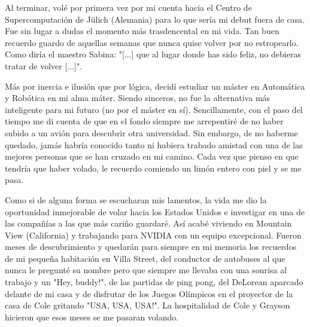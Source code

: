 Al terminar, volé por primera vez por mi cuenta hacia el Centro de Supercomputación de Jülich (Alemania) para lo que sería mi debut fuera de casa. Fue sin lugar a dudas el momento más trasdencental en mi vida. Tan buen recuerdo guardo de aquellas semanas que nunca quise volver por no estropearlo. Como diría el maestro Sabina: "[...] que al lugar donde has sido feliz, no debieras tratar de volver [...]".

Más por inercia e ilusión que por lógica, decidí estudiar un máster en Automática y Robótica en mi alma máter. Siendo sinceros, no fue la alternativa más inteligente para mi futuro (no por el máster en sí). Sencillamente, con el paso del tiempo me di cuenta de que en el fondo siempre me arrepentiré de no haber subido a un avión para descubrir otra universidad. Sin embargo, de no haberme quedado, jamás habría conocido tanto ni hubiera trabado amistad con una de las mejores personas que se han cruzado en mi camino. Cada vez que pienso en que tendría que haber volado, le recuerdo comiendo un limón entero con piel y se me pasa.

Como si de alguna forma se escucharan mis lamentos, la vida me dio la oportunidad inmejorable de volar hacia los Estados Unidos e investigar en una de las compañías a las que más cariño guardaré. Así acabé viviendo en Mountain View (California) y trabajando para NVIDIA con un equipo excepcional. Fueron meses de descubrimiento y quedarán para siempre en mi memoria los recuerdos de mi pequeña habitación en Villa Street, del conductor de autobuses al que nunca le pregunté su nombre pero que siempre me llevaba con una sonrisa al trabajo y un "Hey, buddy!", de las partidas de ping pong, del DeLorean aparcado delante de mi casa y de disfrutar de los Juegos Olímpicos en el proyector de la casa de Cole gritando "USA, USA, USA!". La hospitalidad de Cole y Grayson hicieron que esos meses se me pasaran volando.

